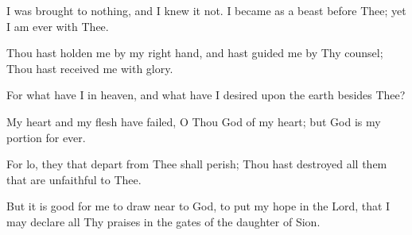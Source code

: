 I was brought to nothing, and I knew it not. I became as a beast before Thee; yet I am ever with Thee.

Thou hast holden me by my right hand, and hast guided me by Thy counsel; Thou
hast received me with glory.

For what have I in heaven, and what have I desired upon the earth besides Thee?

My heart and my flesh have failed, O Thou God of my heart; but God is my portion for ever.

For lo, they that depart from Thee shall perish; Thou hast destroyed all them that are unfaithful to Thee.

But it is good for me to draw near to God, to put my hope in the Lord, that I may declare all Thy praises in the gates of the daughter of Sion.
